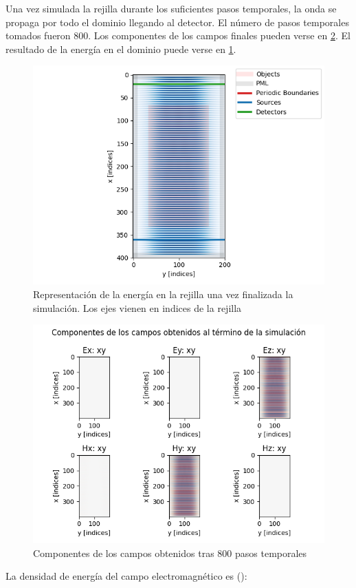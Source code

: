 Una vez simulada la rejilla durante los suficientes pasos temporales, la onda se propaga por todo el dominio llegando al detector. El número de pasos temporales tomados fueron 800. Los componentes de los campos finales pueden verse en \ref{fig:campos_fin}. El resultado de la energía en el dominio puede verse en \ref{fig:setup_2d_2}. 

\begin{figure}
    \centering
    \includegraphics[width=0.7\linewidth]{figures/setup_2d_2.png}
    \caption{Representación de la energía en la rejilla una vez finalizada la simulación. Los ejes vienen en indices de la rejilla}
    \label{fig:setup_2d_2}
\end{figure}

\begin{figure}
    \centering
    \includegraphics[width=0.8\linewidth]{figures/campos_fin.png}
    \caption{Componentes de los campos obtenidos tras 800 pasos temporales}
    \label{fig:campos_fin}
\end{figure}

La densidad de energía del campo electromagnético es (\cite{jackson_classical_1975}): 

